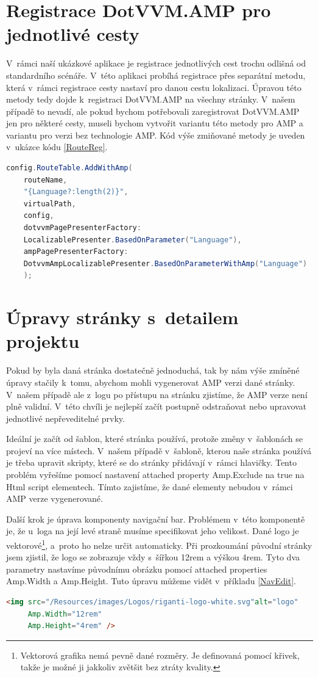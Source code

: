 \section{Registrace DotVVM.AMP pro jednotlivé cesty}
V~rámci naší ukázkové aplikace je registrace jednotlivých cest trochu odlišná od standardního scénáře. V~této aplikaci probíhá registrace přes separátní metodu, která v~rámci registrace cesty nastaví pro danou cestu lokalizaci. Úpravou této metody tedy dojde k~registraci DotVVM.AMP na všechny stránky. V~našem případě to nevadí, ale pokud bychom potřebovali zaregistrovat DotVVM.AMP jen pro některé cesty, museli bychom vytvořit variantu této metody pro AMP a variantu pro verzi bez technologie AMP. Kód výše zmiňované metody je uveden v~ukázce kódu \ref{RouteReg}. 
\begin{lstlisting}[language=c#, caption=Registrace cesty s~DotVVM.AMP,label=RouteReg,captionpos=t]
config.RouteTable.AddWithAmp(
	routeName,
	"{Language?:length(2)}",
	virtualPath,
	config,
	dotvvmPagePresenterFactory:
	LocalizablePresenter.BasedOnParameter("Language"),
	ampPagePresenterFactory:
	DotvvmAmpLocalizablePresenter.BasedOnParameterWithAmp("Language")
	);

\end{lstlisting}

\section{Úpravy stránky s~detailem projektu}
Pokud by byla daná stránka dostatečně jednoduchá, tak by nám výše zmíněné úpravy stačily k~tomu, abychom mohli vygenerovat AMP verzi dané stránky. V~našem případě ale z~logu po přístupu na stránku zjistíme, že AMP verze není plně validní. V~této chvíli je nejlepší začít postupně odstraňovat nebo upravovat jednotlivé nepřeveditelné prvky.

Ideální je začít od šablon, které stránka používá, protože změny v~šablonách se projeví na více místech. V~našem případě v~šabloně, kterou naše stránka používá je třeba upravit skripty, které se do stránky přidávají v~rámci hlavičky. Tento problém vyřešíme pomocí nastavení attached property Amp.Exclude na true na Html script elementech. Tímto zajistíme, že dané elementy nebudou v~rámci AMP verze vygenerované.

Další krok je úprava komponenty navigační bar. Problémem v~této komponentě je, že u~loga na její levé straně musíme specifikovat jeho velikost. Dané logo je vektorové\footnote{Vektorová grafika nemá pevně dané rozměry. Je definovaná pomocí křivek, takže je možné ji jakkoliv zvětšit bez ztráty kvality.}, a~proto ho nelze určit automaticky. Při prozkoumání původní stránky jsem zjistil, že logo se zobrazuje vždy s~šířkou 12rem a výškou 4rem. Tyto dva parametry nastavíme původnímu obrázku pomocí attached properties Amp.Width a Amp.Height. Tuto úpravu můžeme vidět v~příkladu \ref{NavEdit}.
\begin{lstlisting}[language=html, caption=Upřesnění velikosti obrázku.,label=NavEdit,captionpos=t]
<img src="/Resources/images/Logos/riganti-logo-white.svg"alt="logo"
     Amp.Width="12rem"
     Amp.Height="4rem" />
\end{lstlisting}

